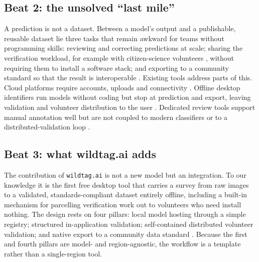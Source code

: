 \documentclass[11pt]{article}
\begin{document}
\subsection*{Beat 2: the unsolved ``last mile''}
A prediction is not a dataset. Between a model's output and a publishable,
reusable dataset lie three tasks that remain awkward for teams without
programming skills: reviewing and correcting predictions at scale; sharing the
verification workload, for example with citizen-science volunteers \cw, without
requiring them to install a software stack; and exporting to a community
standard so that the result is interoperable \cw. Existing tools address parts
of this. Cloud platforms require accounts, uploads and connectivity \cw. Offline
desktop identifiers run models without coding but stop at prediction and export,
leaving validation and volunteer distribution to the user \cw. Dedicated review
tools support manual annotation well but are not coupled to modern classifiers
or to a distributed-validation loop \cw.

\subsection*{Beat 3: what wildtag.ai adds}
The contribution of \texttt{wildtag.ai} is not a new model but an integration.
To our knowledge it is the first free desktop tool that carries a survey from
raw images to a validated, standards-compliant dataset entirely offline,
including a built-in mechanism for parcelling verification work out to
volunteers who need install nothing. The design rests on four pillars: local
model hosting through a simple registry; structured in-application validation;
self-contained distributed volunteer validation; and native export to a
community data standard \cw. Because the first and fourth pillars are model- and
region-agnostic, the workflow is a template rather than a single-region tool.
\end{document}
